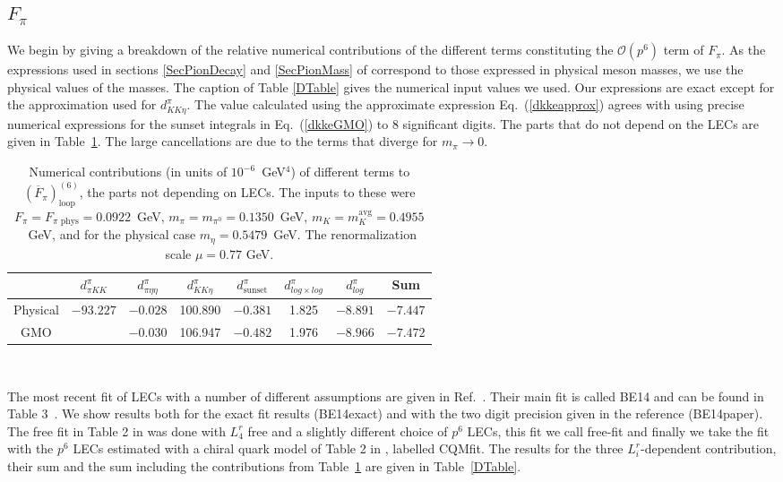 \documentclass[12pt,a4paper]{article}
\begin{document}
\subsection{$F_\pi$}

We begin by giving a breakdown of the relative numerical contributions of the different terms constituting the $\mathcal{O}(p^6)$ term of $F_{\pi}$. As the expressions used in sections \ref{SecPionDecay} and \ref{SecPionMass} of \cite{Amoros:1999dp}
correspond to those expressed in physical meson masses, we use the physical values of the masses. The caption of Table \ref{DTable} gives the numerical input values we used. Our expressions are exact except for the approximation used for
$d^\pi_{KK\eta}$. The value calculated using the approximate expression Eq.~(\ref{dkkeapprox}) agrees with using precise numerical expressions for the sunset integrals in Eq.~(\ref{dkkeGMO}) to 8 significant digits. The parts that do not depend on the LECs are given in Table~\ref{DTable1}. The large cancellations are due to the terms that diverge for $m_\pi\rightarrow0$.
\begin{table}
\centering
\begin{tabular}{| c || c c c || c c c | c | }
\hline
& $d^\pi_{\pi KK}$ & $d^\pi_{\pi\eta\eta}$ & $d^\pi_{KK\eta}$ & ${d}^{\pi}_{\text{sunset}}$ & $d^{\pi}_{log \times log}$ & $d^{\pi}_{log}$  & Sum \\
\hline
\hline
Physical  & \multirow{2}{*}{$-93.227$} & $-0.028$ & 100.890 & $-0.381$ & 1.825 & $-8.891$ & $-7.447$ \\
GMO &  & $-0.030$ & 106.947 & $-0.482$ & 1.976 & $-8.966$ & $-7.472$ \\[1ex]
\hline
\end{tabular} \\
\caption{Numerical contributions (in units of $10^{-6}$~GeV$^{4}$) of different terms to $\left( \overline{F}_{\pi} \right)^{(6)}_{\text{loop}}$, the parts not depending on LECs.  The inputs to these were $F_\pi = F_{\pi\text{ phys}} = 0.0922$~GeV, $m_{\pi} = m_{\pi^0} = 0.1350$~GeV, $m_{K} = m_{K}^{\text{avg}} = 0.4955$~GeV, and for the physical case $m_{\eta} = 0.5479$~GeV. The renormalization scale $\mu = 0.77$ GeV.}
\label{DTable1}
\end{table}

The most recent fit of LECs with a number of different assumptions are given in Ref.~\cite{Bijnens:2014lea}.
Their main fit is called BE14 and can be found in Table 3~\cite{Bijnens:2014lea}. We show results both for the exact fit results (BE14exact) and with the two digit precision given in the reference (BE14paper). The free fit in Table 2 in \cite{Bijnens:2014lea} was done with $L_4^r$ free and a slightly different choice of $p^6$ LECs, this fit we call free-fit and finally we take the fit with the $p^6$ LECs estimated with a chiral quark model of Table 2 in \cite{Bijnens:2014lea}, labelled CQMfit. The results for the three $L_i^r$-dependent contribution, their sum and the sum including the contributions from Table~\ref{DTable1} are given in Table~\ref{DTable}.
\end{document}
